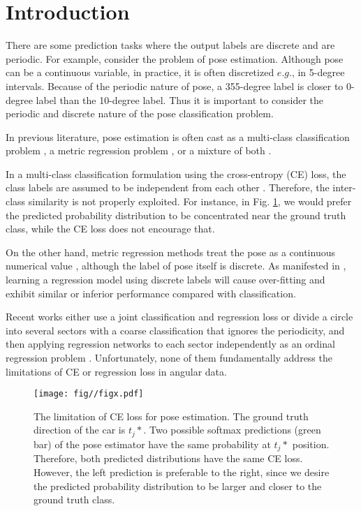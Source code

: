 \section{Introduction}






There are some prediction tasks where the output labels are discrete and are periodic. For example, consider the problem of pose estimation. Although pose can be a continuous variable, in practice, it is often discretized $e.g.$, in 5-degree intervals. Because of the periodic nature of pose, a 355-degree label is closer to 0-degree label than the 10-degree label. Thus it is important to consider the periodic and discrete nature of the pose classification problem.


In previous literature, pose estimation is often cast as a multi-class classification problem \cite{raza2018appearance}, a metric regression problem \cite{prokudin2018deep}, or a mixture of both \cite{mahendran2018mixed}.

In a multi-class classification formulation using the cross-entropy (CE) loss, the class labels are assumed to be independent from each other \cite{raza2018appearance,liu2019research,liu2019feature}. Therefore, the inter-class similarity is not properly exploited. For instance, in Fig. \ref{fig:1}, we would prefer the predicted probability distribution to be concentrated near the ground truth class, while the CE loss does not encourage that.

On the other hand, metric regression methods treat the pose as a continuous numerical value \cite{liu2017adaptive,liu2018adaptive,liu2019hard}, although the label of pose itself is discrete. As manifested in \cite{liu2018ordinal,liu2019unimodala,liu2019unimodalb}, learning a regression model using discrete labels will cause over-fitting and exhibit similar or inferior performance compared with classification.

Recent works either use a joint classification and regression loss \cite{mahendran2018mixed} or divide a circle into several sectors with a coarse classification that ignores the periodicity, and then applying regression networks to each sector independently as an ordinal regression problem \cite{hara2017designing}. Unfortunately, none of them fundamentally address the limitations of CE or regression loss in angular data. 




\begin{figure}[t]
\centering
\texttt{[image: fig//figx.pdf]}\\
\caption{The limitation of CE loss for pose estimation. The ground truth direction of the car is $t_j \ast$. Two possible softmax predictions (green bar) of the pose estimator have the same probability at $t_j \ast$ position. Therefore, both predicted distributions have the same CE loss. However, the left prediction is preferable to the right, since we desire the predicted probability distribution to be larger and closer to the ground truth class.}\label{fig:1} 
\end{figure}



